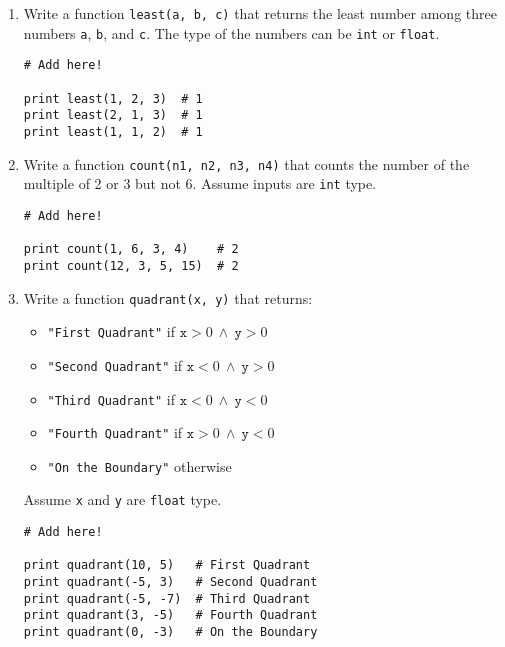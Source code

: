 \documentclass[../main.tex]{subfiles}
\begin{document}
\begin{enumerate}
\item Write a function \texttt{least(a, b, c)} that returns the least number among three numbers \texttt{a}, \texttt{b}, and \texttt{c}.
The type of the numbers can be \texttt{int} or \texttt{float}.
\begin{verbatim}
# Add here!

print least(1, 2, 3)  # 1
print least(2, 1, 3)  # 1
print least(1, 1, 2)  # 1
\end{verbatim}

\item Write a function \texttt{count(n1, n2, n3, n4)} that counts the number of the multiple of 2 or 3 but not 6. Assume inputs are \texttt{int} type.
\begin{verbatim}
# Add here!

print count(1, 6, 3, 4)    # 2
print count(12, 3, 5, 15)  # 2
\end{verbatim}

\item Write a function \texttt{quadrant(x, y)} that returns:
\begin{itemize}
\item \texttt{"First Quadrant"} if $\texttt{x} > 0\ \wedge\ \texttt{y} > 0$
\item \texttt{"Second Quadrant"} if $\texttt{x} < 0\ \wedge\ \texttt{y} > 0$
\item \texttt{"Third Quadrant"} if $\texttt{x} < 0\ \wedge\ \texttt{y} < 0$
\item \texttt{"Fourth Quadrant"} if $\texttt{x} > 0\ \wedge\ \texttt{y} < 0$
\item \texttt{"On the Boundary"} otherwise
\end{itemize}
Assume \texttt{x} and \texttt{y} are \texttt{float} type.
\begin{verbatim}
# Add here!

print quadrant(10, 5)   # First Quadrant
print quadrant(-5, 3)   # Second Quadrant
print quadrant(-5, -7)  # Third Quadrant
print quadrant(3, -5)   # Fourth Quadrant
print quadrant(0, -3)   # On the Boundary
\end{verbatim}


\end{enumerate}
\end{document}
